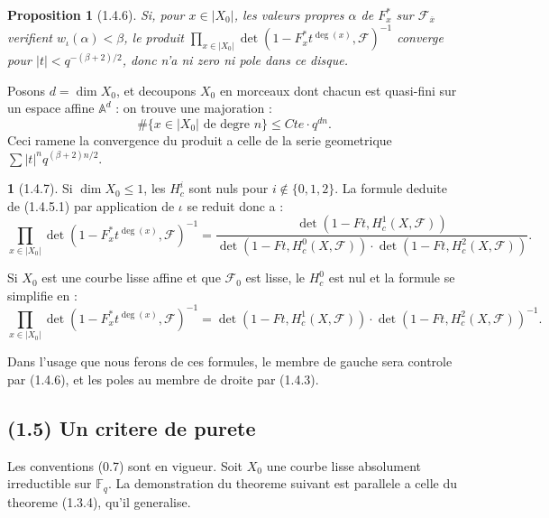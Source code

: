 \documentclass[12pt,a4paper]{article}
\theoremstyle{plain}
\newtheorem{proposition}[theorem]{Proposition}
\theoremstyle{definition}
\theoremstyle{definition}
\newtheorem{para}{}[section]
\theoremstyle{remark}
\begin{document}
\begin{proposition}[1.4.6]
Si, pour $x \in |X_0|$, les valeurs propres $\alpha$ de $F_x^*$ sur $\mathscr{F}_{\overline{x}}$ verifient $w_\iota(\alpha) < \beta$, le produit $\prod_{x \in |X_0|} \det(1 - F_x^* t^{\deg(x)}, \mathscr{F})^{-1}$ converge pour $|t| < q^{-(\beta+2)/2}$, donc n'a ni zero ni pole dans ce disque.
\end{proposition}

Posons $d = \dim X_0$, et decoupons $X_0$ en morceaux dont chacun est quasi-fini sur un espace affine $\mathbb{A}^d$ : on trouve une majoration :
\[\#\{x \in |X_0| \text{ de degre } n\} \leq Cte \cdot q^{dn}.\]
Ceci ramene la convergence du produit a celle de la serie geometrique $\sum |t|^n q^{(\beta+2)n/2}$.

\begin{para}[1.4.7]
Si $\dim X_0 \leq 1$, les $H_c^i$ sont nuls pour $i \notin \{0, 1, 2\}$. La formule deduite de (1.4.5.1) par application de $\iota$ se reduit donc a :
\begin{equation}\tag{1.4.7.1}
\prod_{x \in |X_0|} \det(1 - F_x^* t^{\deg(x)}, \mathscr{F})^{-1} = \frac{\det(1 - Ft, H_c^1(X, \mathscr{F}))}{\det(1 - Ft, H_c^0(X, \mathscr{F})) \cdot \det(1 - Ft, H_c^2(X, \mathscr{F}))}.
\end{equation}

Si $X_0$ est une courbe lisse affine et que $\mathscr{F}_0$ est lisse, le $H_c^0$ est nul et la formule se simplifie en :
\begin{equation}\tag{1.4.7.2}
\prod_{x \in |X_0|} \det(1 - F_x^* t^{\deg(x)}, \mathscr{F})^{-1} = \det(1 - Ft, H_c^1(X, \mathscr{F})) \cdot \det(1 - Ft, H_c^2(X, \mathscr{F}))^{-1}.
\end{equation}

Dans l'usage que nous ferons de ces formules, le membre de gauche sera controle par (1.4.6), et les poles au membre de droite par (1.4.3).
\end{para}

\newpage

\subsection*{(1.5) Un critere de purete}

Les conventions (0.7) sont en vigueur. Soit $X_0$ une courbe lisse absolument irreductible sur $\mathbb{F}_q$. La demonstration du theoreme suivant est parallele a celle du theoreme (1.3.4), qu'il generalise.
\end{document}
